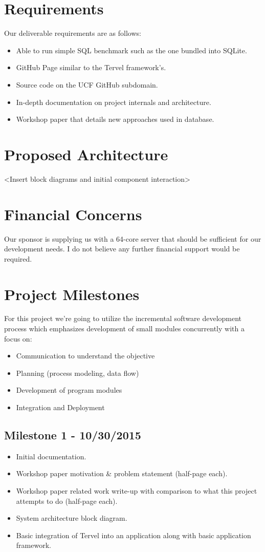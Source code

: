 \documentclass[letterpaper]{article}
\begin{document}
  \section{Requirements}
  Our deliverable requirements are as follows:
  \begin{itemize}
   \item Able to run simple SQL benchmark such as the one bundled into SQLite.
   \item GitHub Page similar to the Tervel framework's.
   \item Source code on the UCF GitHub subdomain.
   \item In-depth documentation on project internals and architecture.
   \item Workshop paper that details new approaches used in database.
  \end{itemize}
  
  \section{Proposed Architecture}
  \textless Insert block diagrams and initial component interaction\textgreater
  
  \section{Financial Concerns}
  Our sponsor is supplying us with a 64-core server that should be sufficient for our development needs. I do not believe any further financial
  support would be required.
  
  \section{Project Milestones}
  For this project we're going to utilize the incremental software development process which emphasizes development of small modules concurrently
  with a focus on:
  \begin{itemize}
   \item Communication to understand the objective
   \item Planning (process modeling, data flow)
   \item Development of program modules
   \item Integration and Deployment
  \end{itemize}
  \subsection{Milestone 1 - 10/30/2015}
  \begin{itemize}
   \item Initial documentation.
   \item Workshop paper motivation \& problem statement (half-page each).
   \item Workshop paper related work write-up with comparison to what this project attempts to do (half-page each).
   \item System architecture block diagram.
   \item Basic integration of Tervel into an application along with basic application framework.
  \end{itemize}
\end{document}
